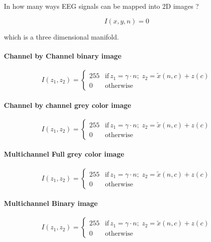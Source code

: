 In how many ways EEG signals can be mapped into 2D images ?

\begin{equation}
I(x,y,n) = 0
\label{eq:standarizedaverages}
\end{equation}

which is a three dimensional manifold.

\paragraph{Channel by Channel binary image }
\begin{equation}
I(z_1,z_2) = \left\{ \begin{array}{rl}
255 & \text{if} \,  z_1 = \gamma \cdot n; \; z_2 = \tilde{x}(n,c) + z(c) \\
0   & \mbox{otherwise}
\end{array}\right.
\label{eq:images}
\end{equation}
\paragraph{Channel by channel grey color image}
\begin{equation}
I(z_1,z_2) = \left\{ \begin{array}{rl}
255 & \text{if} \,  z_1 = \gamma \cdot n; \; z_2 = \tilde{x}(n,c) + z(c) \\
0   & \mbox{otherwise}
\end{array}\right.
\label{eq:images}
\end{equation}
\paragraph{Multichannel Full grey color image}
\begin{equation}
I(z_1,z_2) = \left\{ \begin{array}{rl}
255 & \text{if} \,  z_1 = \gamma \cdot n; \; z_2 = \tilde{x}(n,c) + z(c) \\
0   & \mbox{otherwise}
\end{array}\right.
\label{eq:images}
\end{equation}
\paragraph{Multichannel Binary image}
\begin{equation}
I(z_1,z_2) = \left\{ \begin{array}{rl}
255 & \text{if} \,  z_1 = \gamma \cdot n; \; z_2 = \tilde{x}(n,c) + z(c) \\
0   & \mbox{otherwise}
\end{array}\right.
\label{eq:images}
\end{equation}
